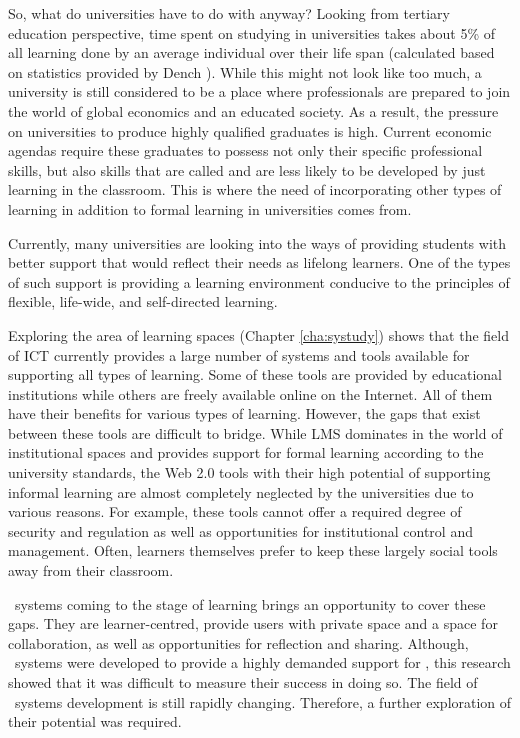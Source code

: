 So, what do universities have to do with \LLLs anyway? Looking from tertiary
education perspective, time spent on studying in universities takes about 5\% of
all learning done by an average individual over their life span (calculated
based on statistics provided by Dench \citeyearpar[pp.~28-37]{Dench2010}). While
this might not look like too much, a university is still considered to be a
place where professionals are prepared to join the world of global economics
and an educated society. As a result, the pressure on universities to produce
highly qualified graduates is high. Current economic agendas require these
graduates to possess not only their specific professional skills, but also
skills that are called \LLLs and are less likely to be developed by just
learning in the classroom. This is where the need of incorporating other types
of learning in addition to formal learning in universities comes from.

Currently, many universities are looking into the ways of providing students
with better support that would reflect their needs as lifelong learners. One of
the types of such support is providing a learning environment conducive to the
principles of flexible, life-wide, and self-directed learning.


Exploring the area of learning spaces (Chapter \ref{cha:systudy}) shows that
the field of ICT currently provides a large number of systems and tools
available for supporting all types of learning. Some of these tools are provided
by educational institutions while others are freely available online on the
Internet. All of them have their benefits for various types of learning.
However, the gaps that exist between these tools are difficult to bridge. While
LMS dominates in the world of institutional spaces and provides support for
formal learning according to the university standards, the Web 2.0 tools with
their high potential of supporting informal learning are almost completely
neglected by the universities due to various reasons. For example, these tools
cannot offer a required degree of security and regulation as well as
opportunities for institutional control and management. Often, learners
themselves prefer to keep these largely social tools away from their classroom.

\ep~systems coming to the stage of learning brings an opportunity to cover these
gaps. They are learner-centred, provide users with private space and a space for
collaboration, as well as opportunities for reflection and sharing. Although,
\ep~systems were developed to provide a highly demanded support for \LLLsn, this
research showed that it was difficult to measure their success in doing so. The
field of \ep~systems development is still rapidly changing. Therefore, a further
exploration of their potential was required.

